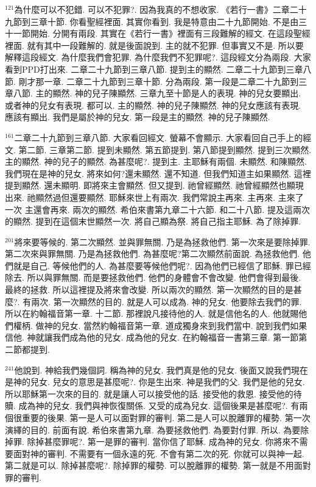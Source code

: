 \documentclass{book}
\begin{document}
$^{121}$為什麼可以不犯錯.
可以不犯罪?.
因為我真的不想收家.
《若行一書》二章二十九節到三章十節.
你看聖經裡面.
其實你看到.
我是特意由二十九節開始.
不是由三十一節開始.
分開有兩段.
其實在《若行一書》裡面有三段難解的經文.
在這段聖經裡面.
就有其中一段難解的.
就是後面說到.
主的就不犯罪.
但事實又不是.
所以要解釋這段經文.
為什麼我們會犯罪.
為什麼我們不犯罪呢?.
這段經文分為兩段.
大家看到PPD打出來.
二章二十九節到三章八節.
提到主的顯然.
二章二十九節到三章八節.
剛才那一章.
二章二十九節到三章十節.
分為兩段.
第一段是二章二十九節到三章八節.
主的顯然.
神的兒子陳顯然.
三章九至十節是人的表現.
神的兒女要顯出.
或者神的兒女有表現.
都可以.
主的顯然.
神的兒子陳顯然.
神的兒女應該有表現.
應該有顯出.
我們是屬於神的兒女.
第一段是主的顯然.
神的兒子陳顯然.

$^{161}$二章二十九節到三章八節.
大家看回經文.
螢幕不會顯示.
大家看回自己手上的經文.
第二節.
三章第二節.
提到未顯然.
第五節提到.
第八節提到顯然.
提到三次顯然.
主的顯然.
神的兒子的顯然.
為甚麼呢?.
提到主.
主耶穌有兩個.
未顯然.
和陳顯然.
我們現在是神的兒女.
將來如何?還未顯然.
還不知道.
但我們知道主如果顯然.
這裡提到顯然.
還未顯明.
即將來主會顯然.
但又提到.
祂曾經顯然.
祂曾經顯然也顯現出來.
祂顯然過但還要顯然.
耶穌來世上有兩次.
我們常說主再來.
主再來.
主來了一次 主還會再來.
兩次的顯然.
希伯來書第九章二十六節.
和二十八節.
提及這兩次的顯然.
提到在這個末世顯然一次.
將自己顯為祭.
將自己指主耶穌.
為了除掉罪.

$^{201}$將來要等候的.
第二次顯然.
並與罪無關.
乃是為拯救他們.
第一次來是要除掉罪.
第二次來與罪無關.
乃是為拯救他們.
為甚麼呢?第二次顯然前面說.
為拯救他們.
他們就是自己.
等候他們的人.
為甚麼要等候他們呢?.
因為他們已經信了耶穌.
罪已經除去.
所以與罪無關.
而是要拯救他們.
他們的身體會不會改變.
他們會得到最後.
最終的拯救.
所以這裡提及將來會改變.
所以兩次的顯然.
第一次顯然的目的是甚麼?.
有兩次.
第一次顯然的目的.
就是人可以成為.
神的兒女.
他要除去我們的罪.
所以在約翰福音第一章.
十二節.
那裡說凡接待他的人.
就是信他名的人.
他就賜他們權柄.
做神的兒女.
當然約翰福音第一章.
道成獨身來到我們當中.
說到我們如果信他.
神就讓我們成為他的兒女.
成為他的兒女.
在約翰福音一書第三章.
第一節第二節都提到.

$^{241}$他說到.
神給我們幾個詞.
稱為神的兒女.
我們真是他的兒女.
後面又說我們現在是神的兒女.
兒女的意思是甚麼呢?.
你是生出來.
神是我們的父.
我們是他的兒女.
所以耶穌第一次來的目的.
就是讓人可以接受他的話.
接受他的救恩.
接受他的待贖.
成為神的兒女.
我們與神恢復關係.
又受的成為兒女.
這個後果是甚麼呢?.
有兩個很重要的後果.
第一是人可以面對罪的審判.
第二是人可以脫離罪的權勢.
第一次演繹的目的.
前面有說.
希伯來書第九章.
為要拯救他們.
為要對付罪.
所以.
為要除掉罪.
除掉甚麼罪呢?.
第一是罪的審判.
當你信了耶穌.
成為神的兒女.
你將來不需要面對神的審判.
不需要有一個永遠的死.
不會有第二次的死.
你就可以與神一起.
第二就是可以.
除掉甚麼呢?.
除掉罪的權勢.
可以脫離罪的權勢.
第一就是不用面對罪的審判.
\end{document}
